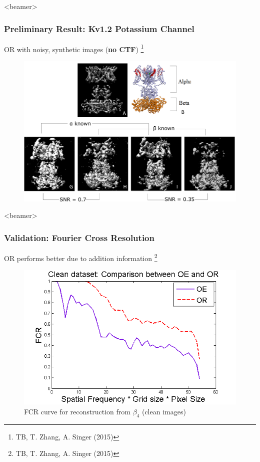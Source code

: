 \documentclass{beamer}
\newcommand\blfootnote[1]{%
  \begingroup
  \renewcommand\thefootnote{}\footnote{#1}%
  \addtocounter{footnote}{-1}%
  \endgroup
}
\begin{document}
\begin{frame}<beamer>
\frametitle{Preliminary Result: Kv1.2 Potassium Channel}
OR with noisy, synthetic images (\textbf{no CTF}) \blfootnote{TB, T. Zhang, A. Singer (2015)}
\begin{figure}[!htbp]
\begin{center}
\includegraphics[width=.65 \columnwidth]{figures/reconstruction_all_noisy.pdf}
\end{center}
\end{figure}
\end{frame}

\begin{frame}<beamer>
\frametitle{Validation: Fourier Cross Resolution}
OR performs better due to addition information \blfootnote{TB, T. Zhang, A. Singer (2015)}
\begin{figure}[t]
  \centering
  \includegraphics[width=.8\columnwidth]{figures/FSC_final.png}
  \caption{FCR curve for reconstruction from $\beta_4$ (clean images)}\label{fig:fsc}
\end{figure}
\end{frame}
\end{document}
